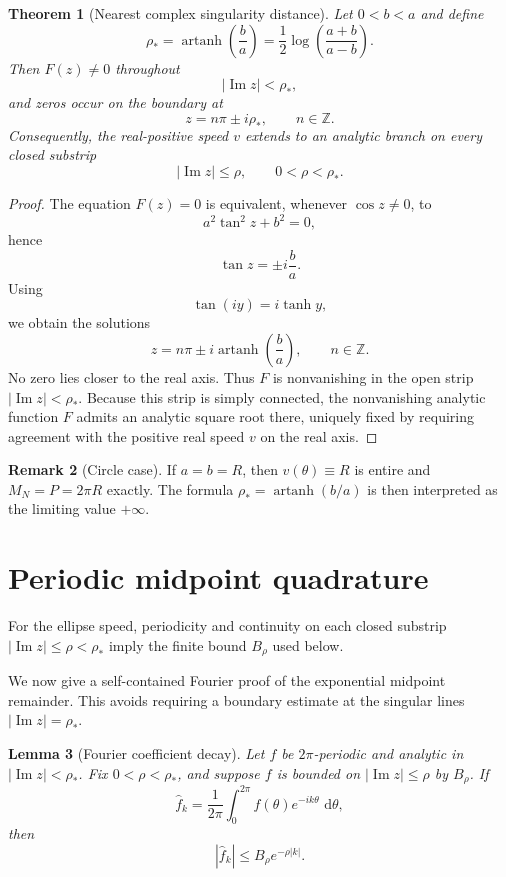 \documentclass[11pt]{article}
\newtheorem{theorem}{Theorem}[section]
\newtheorem{lemma}[theorem]{Lemma}
\theoremstyle{definition}
\newtheorem{remark}[theorem]{Remark}
\newcommand{\dd}{\,\mathrm{d}}
\numberwithin{equation}{section}
\begin{document}
\begin{theorem}[Nearest complex singularity distance]
\label{thm:strip}
Let \(0<b<a\) and define
\begin{equation}
\label{eq:rhostar}
\boxed{
\rho_*=
\operatorname{artanh}\!\left(\frac ba\right)
=
\frac12\log\!\left(\frac{a+b}{a-b}\right).
}
\end{equation}
Then \(F(z)\neq0\) throughout
\[
|\operatorname{Im}z|<\rho_*,
\]
and zeros occur on the boundary at
\[
z=n\pi\pm i\rho_*,
\qquad n\in\mathbb Z.
\]
Consequently, the real-positive speed \(v\) extends to an analytic
branch on every closed substrip
\[
|\operatorname{Im}z|\le\rho,
\qquad 0<\rho<\rho_*.
\]
\end{theorem}

\begin{proof}
The equation \(F(z)=0\) is equivalent, whenever \(\cos z\neq0\), to
\[
a^2\tan^2z+b^2=0,
\]
hence
\[
\tan z=\pm i\frac ba.
\]
Using
\[
\tan(iy)=i\tanh y,
\]
we obtain the solutions
\[
z=n\pi\pm i\operatorname{artanh}\!\left(\frac ba\right),
\qquad n\in\mathbb Z.
\]
No zero lies closer to the real axis.  Thus \(F\) is nonvanishing in
the open strip \(|\operatorname{Im}z|<\rho_*\).  Because this strip is
simply connected, the nonvanishing analytic function \(F\) admits an
analytic square root there, uniquely fixed by requiring agreement with
the positive real speed \(v\) on the real axis.
\end{proof}

\begin{remark}[Circle case]
If \(a=b=R\), then \(v(\theta)\equiv R\) is entire and
\(M_N=P=2\pi R\) exactly.  The formula \(\rho_*=\operatorname{artanh}(b/a)\)
is then interpreted as the limiting value \(+\infty\).
\end{remark}

\section{Periodic midpoint quadrature}

For the ellipse speed, periodicity and continuity on each closed substrip
$|\operatorname{Im}z|\le\rho<\rho_*$ imply the finite bound $B_\rho$
used below.\par

We now give a self-contained Fourier proof of the exponential midpoint
remainder.  This avoids requiring a boundary estimate at the singular
lines \(|\operatorname{Im}z|=\rho_*\).

\begin{lemma}[Fourier coefficient decay]
\label{lem:fourierdecay}
Let \(f\) be \(2\pi\)-periodic and analytic in
\(|\operatorname{Im}z|<\rho_*\).  Fix \(0<\rho<\rho_*\), and suppose
\(f\) is bounded on \(|\operatorname{Im}z|\le\rho\) by \(B_\rho\).
If
\[
\widehat f_k
=
\frac1{2\pi}\int_0^{2\pi}f(\theta)e^{-ik\theta}\,\dd\theta,
\]
then
\[
|\widehat f_k|
\le
B_\rho e^{-\rho|k|}.
\]
\end{lemma}
\end{document}
